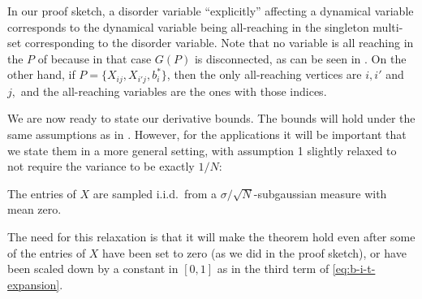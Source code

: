 \documentclass{article}
\newcommand{\1}{\mathbbm{1}}
\theoremstyle{plain}
\theoremstyle{definition}
\theoremstyle{remark}
\begin{document}
In our proof sketch, a disorder variable ``explicitly'' affecting a dynamical variable corresponds to the dynamical variable being all-reaching in the singleton multi-set corresponding to the disorder variable. Note that no variable is all reaching in the $P$ of  because in that case $G(P)$ is disconnected, as can be seen in . On the other hand, if $P = \{X_{ij}, X_{i'j}, b^*_i\}$, then the only all-reaching vertices are $i,i'$ and $j,$ and the all-reaching variables are the ones with those indices.

We are now ready to state our derivative bounds. The bounds will hold under the same assumptions as in . However, for the applications it will be important that we state them in a more general setting, with assumption 1 slightly relaxed to not require the variance to be exactly $1/N$:
\begin{assumptions}
  \item[(A1')]\makeatletter
    \protected@edef{}%
  \makeatother
  \label{assump:1-weak}
  The entries of $X$ are sampled i.i.d.\ from a $\sigma/\sqrt{N}$-subgaussian
  measure with mean zero.
\end{assumptions}
The need for this relaxation is that it will make the theorem hold even after some of the entries of $X$ have been set to zero (as we did in the proof sketch), or have been scaled down by a constant in $[0,1]$ as in the third term of \eqref{eq:b-i-t-expansion}.
\end{document}
